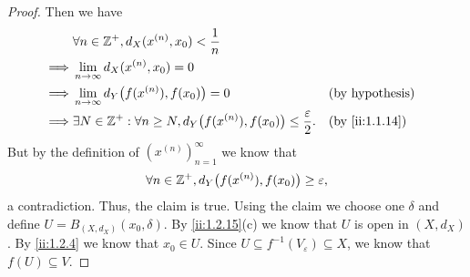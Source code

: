 \begin{proof}
  Then we have
  \begin{align*}
             & \forall n \in \Z^+, d_X(x^{(n)}, x_0) < \dfrac{1}{n}                                                                            \\
    \implies & \lim_{n \to \infty} d_X(x^{(n)}, x_0) = 0                                                                                       \\
    \implies & \lim_{n \to \infty} d_Y\big(f(x^{(n)}), f(x_0)\big) = 0                                             &  & \text{(by hypothesis)} \\
    \implies & \exists N \in \Z^+ : \forall n \geq N, d_Y\big(f(x^{(n)}), f(x_0)\big) \leq \dfrac{\varepsilon}{2}. &  & \by{ii:1.1.14}
  \end{align*}
  But by the definition of \((x^{(n)})_{n = 1}^\infty\) we know that
  \[
    \forall n \in \mathbb{Z}^+, d_Y\big(f(x^{(n)}), f(x_0)\big) \geq \varepsilon,
  \]
  a contradiction.
  Thus, the claim is true.
  Using the claim we choose one \(\delta\) and define \(U = B_{(X, d_X)}(x_0, \delta)\).
  By \cref{ii:1.2.15}(c) we know that \(U\) is open in \((X, d_X)\).
  By \cref{ii:1.2.4} we know that \(x_0 \in U\).
  Since \(U \subseteq f^{-1}(V_\varepsilon) \subseteq X\), we know that \(f(U) \subseteq V\).


\end{proof}
